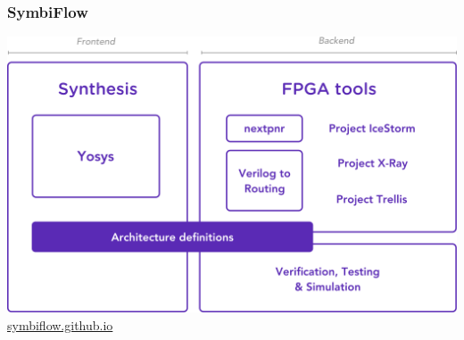 \documentclass{beamer}
\begin{document}
\begin{frame}
\frametitle{SymbiFlow}
\centering
\includegraphics[width=\linewidth]{symbiflow.png}
\vfill
\Large\href{https://symbiflow.github.io/}{symbiflow.github.io}
\end{frame}
\end{document}
